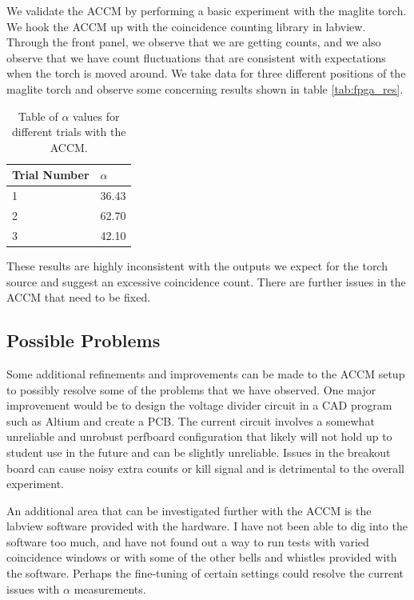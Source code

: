 \documentclass[letterpaper, 11 pt]{article}
\begin{document}
We validate the ACCM by performing a basic experiment with the maglite torch.
We hook the ACCM up with the coincidence counting library in labview. Through the front panel,
we observe that we are getting counts, and we also observe that we have count fluctuations that
are consistent with expectations when the torch is moved around. We take data for three different positions
of the maglite torch and observe some concerning results shown in table \ref{tab:fpga_res}.
\begin{table}[H]
    \centering
    \begin{tabular}{|l|l|}
    \hline
    \textbf{Trial Number} & \textbf{$\alpha$} \\ \hline
    1   & 36.43                  \\ \hline
    2        & 62.70                   \\ \hline
    3        & 42.10                   \\ \hline
    \end{tabular}
    \caption{Table of $\alpha$ values for different trials with the ACCM.}
\end{table}\label{tab:fpga_res}
These results are highly inconsistent with the outputs we expect for the torch source
and suggest an excessive coincidence count. There are further issues in the ACCM that need to be fixed.

\subsection{Possible Problems}

Some additional refinements and improvements can be made to the ACCM setup to possibly
resolve some of the problems that we have observed. One major improvement would be to
design the voltage divider circuit in a CAD program such as Altium and create a PCB.
The current circuit involves a somewhat unreliable and unrobust perfboard configuration that
likely will not hold up to student use in the future and can be slightly unreliable. Issues in the
breakout board can cause noisy extra counts or kill signal and is detrimental to the overall experiment.

An additional area that can be investigated further with the ACCM is the labview software provided
with the hardware. I have not been able to dig into the software too much, and have not found out a way
to run tests with varied coincidence windows or with some of the other bells and whistles provided
with the software. Perhaps the fine-tuning of certain settings could resolve the current issues
with $\alpha$ measurements.
\end{document}
